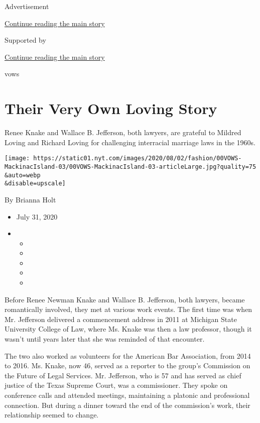 Advertisement

\protect\hyperlink{after-top}{Continue reading the main story}

Supported by

\protect\hyperlink{after-sponsor}{Continue reading the main story}

vows

\hypertarget{their-very-own-loving-story}{%
\section{Their Very Own Loving
Story}\label{their-very-own-loving-story}}

Renee Knake and Wallace B. Jefferson, both lawyers, are grateful to
Mildred Loving and Richard Loving for challenging interracial marriage
laws in the 1960s.

\texttt{[image: https://static01.nyt.com/images/2020/08/02/fashion/00VOWS-MackinacIsland-03/00VOWS-MackinacIsland-03-articleLarge.jpg?quality=75\\\&auto=webp\\\&disable=upscale]}

By Brianna Holt

\begin{itemize}
\item
  July 31, 2020
\item
  \begin{itemize}
  \item
  \item
  \item
  \item
  \item
  \end{itemize}
\end{itemize}

Before Renee Newman Knake and Wallace B. Jefferson, both lawyers, became
romantically involved, they met at various work events. The first time
was when Mr. Jefferson delivered a commencement address in 2011 at
Michigan State University College of Law, where Ms. Knake was then a law
professor, though it wasn't until years later that she was reminded of
that encounter.

The two also worked as volunteers for the American Bar Association, from
2014 to 2016. Ms. Knake, now 46, served as a reporter to the group's
Commission on the Future of Legal Services. Mr. Jefferson, who is 57 and
has served as chief justice of the Texas Supreme Court, was a
commissioner. They spoke on conference calls and attended meetings,
maintaining a platonic and professional connection. But during a dinner
toward the end of the commission's work, their relationship seemed to
change.

